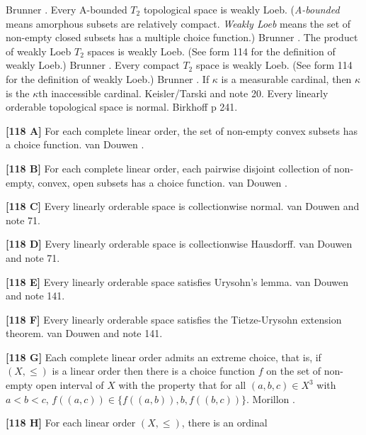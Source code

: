 \ac{Brunner} \cite{1985a}. 
\medskip
{} Every A-bounded $T_2$ topological space is weakly
Loeb. ({\it A-bounded} means amorphous subsets are relatively compact.
{\it Weakly Loeb} means the set of non-empty closed subsets
has a multiple choice function.) \ac{Brunner} \cite{1985a}.
\medskip
{} The product of weakly Loeb $T_2$ spaces is weakly
Loeb. (See form 114 for the definition of weakly Loeb.) \ac{Brunner}
\cite{1985a}.
\medskip
{}  Every compact $T_2$ space is weakly  Loeb. (See
form 114 for the definition of weakly Loeb.)  \ac{Brunner} \cite{1985a}.
\medskip
{}  If $\kappa$ is a measurable cardinal,
then $\kappa$ is the $\kappa$th inaccessible cardinal. \ac{Keisler/Tarski}
\cite{1964} and note 20.
\medskip
{}  Every linearly orderable topological space is
normal.  \ac{Birkhoff} \cite{1967} p 241.
\smallskip
\item{}{\bf [118 A]}  For each complete linear order, the set of non-empty
convex subsets has a choice function.  van \ac{Douwen} \cite{1985}.
\smallskip
\item{}{\bf [118 B]}  For each complete linear order, each pairwise
disjoint collection of non-empty, convex, open  subsets has a choice
function.  van \ac{Douwen} \cite{1985}.
\smallskip
\item{}{\bf [118 C]}   Every linearly orderable space is collectionwise
normal.  van \ac{Douwen} \cite{1985} and note 71.
\smallskip
\item{}{\bf [118 D]}   Every linearly orderable space is collectionwise
Hausdorff.  van \ac{Douwen} \cite{1985} and note 71.
\smallskip
\item{}{\bf [118 E]}   Every linearly  orderable space satisfies Urysohn's
lemma.  van \ac{Douwen} \cite{1985} and note 141.
\smallskip
\item{}{\bf [118 F]}  Every linearly orderable space satisfies the
Tietze-Urysohn extension theorem. van \ac{Douwen} \cite{1985} and
note 141.
\smallskip
\item{}{\bf [118 G]}  Each complete linear order admits an extreme choice,
that is, if $(X,\le)$ is a linear order then there is a choice function $f$
on the set of non-empty open interval of $X$ with the property that for all
$(a,b,c)\in X^3$ with $a < b < c$, $f((a,c))\in\{f((a,b)),b,f((b,c)) \}$.
\ac{Morillon} \cite{1991a}.
\smallskip
\item{}{\bf [118 H]} For each linear order $(X,\le)$, there is an ordinal

